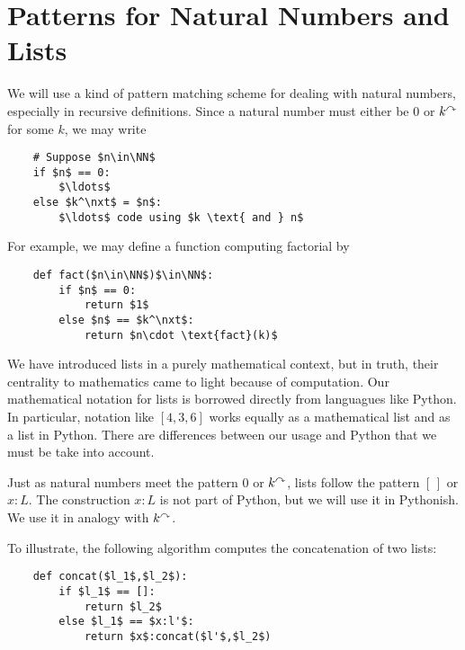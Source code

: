 \section{Patterns for Natural Numbers and Lists}

We will use a kind of pattern matching scheme for dealing with natural numbers, especially in recursive definitions. Since a natural number must either be $0$ or $k^\curvearrowright$ for some $k$, we may write 
\begin{lstlisting}
	# Suppose $n\in\NN$ 
	if $n$ == 0:
		$\ldots$
	else $k^\nxt$ = $n$:
		$\ldots$ code using $k \text{ and } n$
\end{lstlisting}

For example, we may define a function computing factorial by

\begin{lstlisting}
	def fact($n\in\NN$)$\in\NN$:
		if $n$ == 0:
			return $1$
		else $n$ == $k^\nxt$:
			return $n\cdot \text{fact}(k)$
\end{lstlisting}

We have introduced lists in a purely mathematical context, but in
truth, their centrality to mathematics came to light because of
computation. Our mathematical notation for lists is borrowed directly
from languagues like Python. In particular, notation like
$[4,3,6]$ works equally as a mathematical list and as a list in
Python. There are differences between our usage and Python that we must be
take into account.

Just as natural numbers meet the pattern $0$ or $k^\curvearrowright$, lists follow the pattern $[\,]$ or $x:L$. The construction $x:L$ is not part of Python, but we will use it in Pythonish. We use it in analogy with $k^\curvearrowright$.

To illustrate, the following algorithm computes the concatenation of two lists:
\begin{lstlisting}
	def concat($l_1$,$l_2$):
		if $l_1$ == []:
			return $l_2$
		else $l_1$ == $x:l'$:
			return $x$:concat($l'$,$l_2$)
\end{lstlisting}
